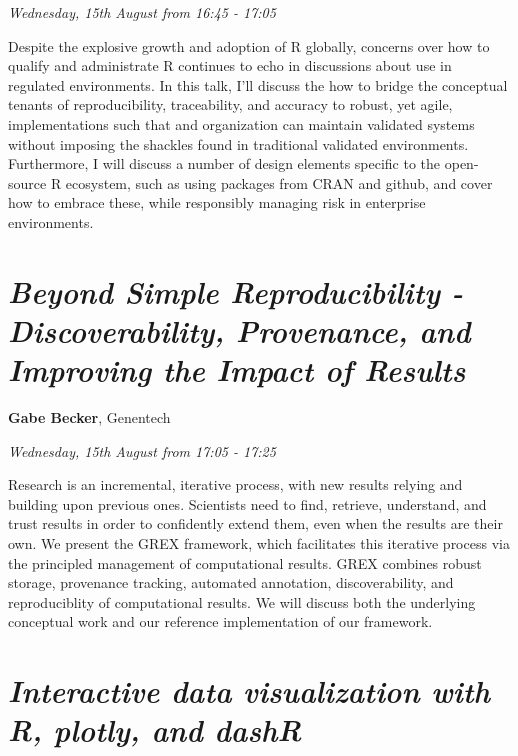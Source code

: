 \documentclass[]{book}
\theoremstyle{definition}
\theoremstyle{definition}
\theoremstyle{definition}
\theoremstyle{remark}
\begin{document}
\emph{Wednesday, 15th August from 16:45 - 17:05}

Despite the explosive growth and adoption of R globally, concerns over
how to qualify and administrate R continues to echo in discussions about
use in regulated environments. In this talk, I'll discuss the how to
bridge the conceptual tenants of reproducibility, traceability, and
accuracy to robust, yet agile, implementations such that and
organization can maintain validated systems without imposing the
shackles found in traditional validated environments. Furthermore, I
will discuss a number of design elements specific to the open-source R
ecosystem, such as using packages from CRAN and github, and cover how to
embrace these, while responsibly managing risk in enterprise
environments.

\hypertarget{beyond-simple-reproducibility---discoverability-provenance-and-improving-the-impact-of-results-1}{%
\section{\texorpdfstring{\emph{Beyond Simple Reproducibility -
Discoverability, Provenance, and Improving the Impact of
Results}}{Beyond Simple Reproducibility - Discoverability, Provenance, and Improving the Impact of Results}}\label{beyond-simple-reproducibility---discoverability-provenance-and-improving-the-impact-of-results-1}}

\textbf{Gabe Becker}, Genentech

\emph{Wednesday, 15th August from 17:05 - 17:25}

Research is an incremental, iterative process, with new results relying
and building upon previous ones. Scientists need to find, retrieve,
understand, and trust results in order to confidently extend them, even
when the results are their own. We present the GREX framework, which
facilitates this iterative process via the principled management of
computational results. GREX combines robust storage, provenance
tracking, automated annotation, discoverability, and reproduciblity of
computational results. We will discuss both the underlying conceptual
work and our reference implementation of our framework.

\hypertarget{interactive-data-visualization-with-r-plotly-and-dashr-1}{%
\section{\texorpdfstring{\emph{Interactive data visualization with R,
plotly, and
dashR}}{Interactive data visualization with R, plotly, and dashR}}\label{interactive-data-visualization-with-r-plotly-and-dashr-1}}
\end{document}
